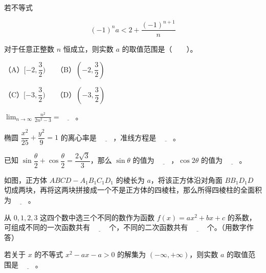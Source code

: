 \begin{question}
若不等式

\nopagebreak[4]
\[
(-1)^n a<2+\frac{(-1)^{n+1}}{n}
\]

对于任意正整数 $n$ 恒成立，则实数 $a$ 的取值范围是\mbox{（　　）}。

（A）$[-2,\dfrac{3}{2})$　　（B）$(-2,\dfrac{3}{2})$

（C）$[-3,\dfrac{3}{2})$　　（D）$(-3,\dfrac{3}{2})$

\end{question}

\begin{question}
$\displaystyle\lim_{n\to\infty}\frac{n^2}{2n^2-3}=\underline{\qquad}$。

\end{question}
\begin{question}
椭圆 $\dfrac{x^2}{25}+\dfrac{y^2}{9}=1$ 的离心率是 $\underline{\qquad}$，准线方程是 $\underline{\qquad}$。

\end{question}
\begin{question}
已知 $\sin\dfrac{\theta}{2}+\cos\dfrac{\theta}{2}=\dfrac{2\sqrt{3}}{3}$，那么 $\sin\theta$ 的值为 $\underline{\qquad}$，$\cos 2\theta$ 的值为 $\underline{\qquad}$。

\Needspace{0.4\textheight}
\end{question}
\begin{question}
如图，正方体 $ABCD-A_1B_1C_1D_1$ 的棱长为 $a$，将该正方体沿对角面 $BB_1D_1D$ 切成两块，再将这两块拼接成一个不是正方体的四棱柱，那么所得四棱柱的全面积为 $\underline{\qquad}$。
\nopagebreak[4]
\begin{center}\end{center}
\nopagebreak[4]
\end{question}
\begin{question}
从 $0,1,2,3$ 这四个数中选三个不同的数作为函数 $f(x)=ax^2+bx+c$ 的系数，可组成不同的一次函数共有 $\underline{\qquad}$ 个，不同的二次函数共有 $\underline{\qquad}$ 个。（用数字作答）

\end{question}
\begin{question}
若关于 $x$ 的不等式 $x^2-ax-a>0$ 的解集为 $(-\infty,+\infty)$，则实数 $a$ 的取值范围是 $\underline{\qquad}$。

\end{question}

